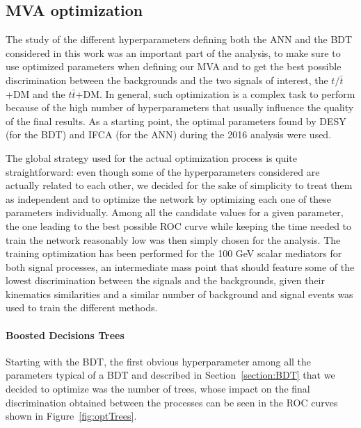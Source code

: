 \documentclass[a4paper, 10pt, openright]{report}
\begin{document}
\begin{appendices}
\chapter{\ac{MVA} optimization} \label{appendix:Optimization}

The study of the different hyperparameters defining both the \ac{ANN} and the \ac{BDT} considered in this work was an important part of the analysis, to make sure to use optimized parameters when defining our \ac{MVA} and to get the best possible discrimination between the backgrounds and the two signals of interest, the $t/ \bar t$+DM and the $t \bar t$+DM. In general, such optimization is a complex task to perform because of the high number of hyperparameters that usually influence the quality of the final results. As a starting point, the optimal parameters found by DESY (for the \ac{BDT}) and IFCA (for the \ac{ANN}) during the 2016 analysis were used. 

The global strategy used for the actual optimization process is quite straightforward: even though some of the hyperparameters considered are actually related to each other, we decided for the sake of simplicity to treat them as independent and to optimize the network by optimizing each one of these parameters individually. Among all the candidate values for a given parameter, the one leading to the best possible ROC curve while keeping the time needed to train the network reasonably low was then simply chosen for the analysis. The training optimization has been performed for the 100 GeV scalar mediators for both signal processes, an intermediate mass point that should feature some of the lowest discrimination between the signals and the backgrounds, given their kinematics similarities and a similar number of background and signal events was used to train the different methods. %

\subsubsection{Boosted Decisions Trees}

Starting with the \ac{BDT}, the first obvious hyperparameter among all the parameters typical of a \ac{BDT} and described in Section~\ref{section:BDT} that we decided to optimize was the number of trees, whose impact on the final discrimination obtained between the processes can be seen in the \ac{ROC} curves shown in Figure~\ref{fig:optTrees}.


\end{appendices}
\end{document}
